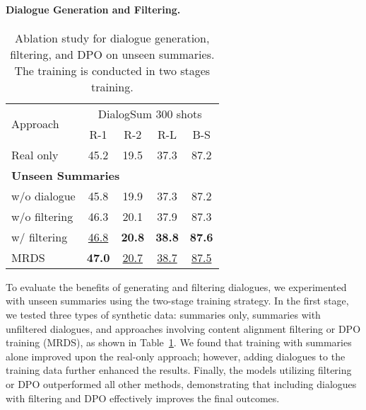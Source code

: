 \paragraph{Dialogue Generation and Filtering.}

\begin{table}[th]
\centering
\caption{Ablation study for dialogue generation, filtering, and DPO on unseen summaries. The training is conducted in two stages training.}
\label{tab:filter}
\begin{tabular}{lcccc}
\toprule
\multirow{2}{*}{Approach}  & \multicolumn{4}{c}{DialogSum 300 shots}  \\
\cmidrule(lr){2-5} 
& R-1 & R-2 & R-L & B-S   \\
\midrule
Real only & 45.2 & 19.5 & 37.3 & 87.2  \\
\midrule
\multicolumn{5}{l}{\textbf{Unseen Summaries}} \\
\midrule
w/o dialogue  & 45.8 & 19.9 & 37.3 & 87.2 \\
w/o filtering & 46.3 & 20.1 & 37.9 & 87.3 \\
w/ filtering &  \underline{46.8} & \textbf{20.8} & \textbf{38.8}  & \textbf{87.6}  \\
\midrule
MRDS & \textbf{47.0} & \underline{20.7} & \underline{38.7} & \underline{87.5}  \\
\bottomrule
\end{tabular}
\end{table}

To evaluate the benefits of generating and filtering dialogues, we experimented with unseen summaries using the two-stage training strategy. In the first stage, we tested three types of synthetic data: summaries only, summaries with unfiltered dialogues, and approaches involving content alignment filtering or DPO training (MRDS), as shown in Table~\ref{tab:filter}. We found that training with summaries alone improved upon the real-only approach; however, adding dialogues to the training data further enhanced the results. Finally, the models utilizing filtering or DPO outperformed all other methods, demonstrating that including dialogues with filtering and DPO effectively improves the final outcomes.







